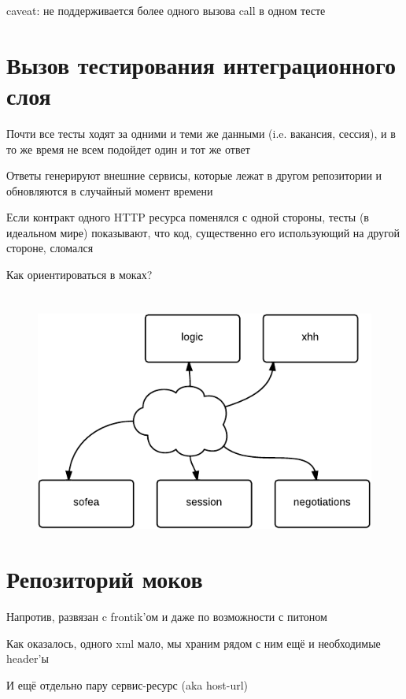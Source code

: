 \documentclass[12pt]{article}
\begin{document}
caveat: не поддерживается более одного вызова call в одном тесте

\section{Вызов тестирования интеграционного слоя}

Почти все тесты ходят за одними и теми же данными (i.e. вакансия, сессия), и в то же время не всем подойдет один и тот же ответ

Ответы генерируют внешние сервисы, которые лежат в другом репозитории и обновляются в случайный момент времени

Если контракт одного HTTP ресурса поменялся с одной стороны, тесты (в идеальном мире) показывают, что код, существенно его использующий на другой стороне, сломался

Как ориентироваться в моках?

\section{}
\begin{figure}
\includegraphics[page=1, scale=2]{interconnection.pdf}
\end{figure}

\section{Репозиторий моков}

Напротив, развязан c frontik'ом и даже по возможности с питоном

Как оказалось, одного xml мало, мы храним рядом с ним ещё и необходимые header'ы

И ещё отдельно пару сервис-ресурс (aka host-url)
\end{document}
